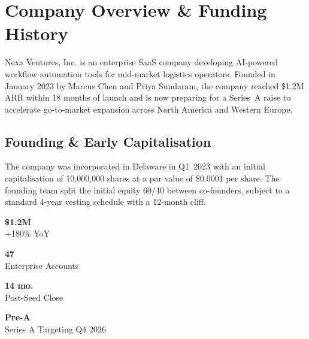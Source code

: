 
\section{Company Overview \& Funding History}

Nexa Ventures, Inc. is an enterprise SaaS company developing AI-powered workflow automation
tools for mid-market logistics operators. Founded in January 2023 by Marcus Chen and
Priya Sundaram, the company reached \$1.2M ARR within 18 months of launch and is now
preparing for a Series~A raise to accelerate go-to-market expansion across North America
and Western Europe.

\subsection{Founding \& Early Capitalisation}

The company was incorporated in Delaware in Q1~2023 with an initial capitalisation of
10,000,000 shares at a par value of \$0.0001 per share. The founding team split the
initial equity 60/40 between co-founders, subject to a standard 4-year vesting schedule
with a 12-month cliff.

\vspace{6pt}
\noindent
\begin{minipage}[t]{0.23\linewidth}
  \begin{tcolorbox}[metricbox, title={\faChartLine\;\,ARR}]
    {\Large\bfseries\color{nexaNavy}\$1.2M}\\
    \small\color{nexaMidGray}+180\% YoY
  \end{tcolorbox}
\end{minipage}%
\hfill
\begin{minipage}[t]{0.23\linewidth}
  \begin{tcolorbox}[metricbox, title={\faUsers\;\,Customers}]
    {\Large\bfseries\color{nexaNavy}47}\\
    \small\color{nexaMidGray}Enterprise Accounts
  \end{tcolorbox}
\end{minipage}%
\hfill
\begin{minipage}[t]{0.23\linewidth}
  \begin{tcolorbox}[metricbox, title={\faClock\;\,Runway}]
    {\Large\bfseries\color{nexaNavy}14 mo.}\\
    \small\color{nexaMidGray}Post-Seed Close
  \end{tcolorbox}
\end{minipage}%
\hfill
\begin{minipage}[t]{0.23\linewidth}
  \begin{tcolorbox}[metricbox, title={\faRocket\;\,Stage}]
    {\Large\bfseries\color{nexaNavy}Pre-A}\\
    \small\color{nexaMidGray}Series A Targeting Q4 2026
  \end{tcolorbox}
\end{minipage}
\par

